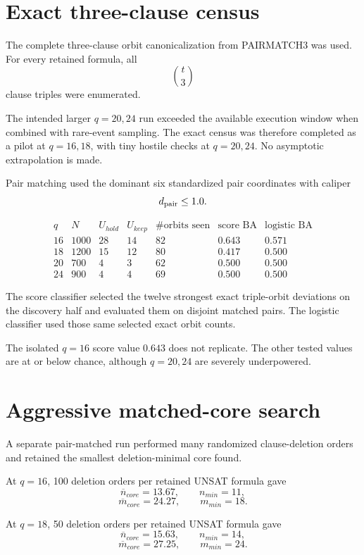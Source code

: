 \documentclass[11pt]{article}
\begin{document}
\section{Exact three-clause census}
The complete three-clause orbit canonicalization from PAIRMATCH3 was used. For every retained formula, all
\[
\binom t3
\]
clause triples were enumerated.

The intended larger \(q=20,24\) run exceeded the available execution window when combined with rare-event sampling. The exact census was therefore completed as a pilot at \(q=16,18\), with tiny hostile checks at \(q=20,24\). No asymptotic extrapolation is made.

Pair matching used the dominant six standardized pair coordinates with caliper
\[
d_{\rm pair}\le1.0.
\]

\[
\begin{array}{c|c|c|c|c|c|c}
q&N&U_{hold}&U_{keep}&\#\text{orbits seen}&
\text{score BA}&\text{logistic BA}\\
\hline
16&1000&28&14&82&0.643&0.571\\
18&1200&15&12&80&0.417&0.500\\
20&700&4&3&62&0.500&0.500\\
24&900&4&4&69&0.500&0.500
\end{array}
\]

The score classifier selected the twelve strongest exact triple-orbit deviations on the discovery half and evaluated them on disjoint matched pairs. The logistic classifier used those same selected exact orbit counts.

The isolated \(q=16\) score value \(0.643\) does not replicate. The other tested values are at or below chance, although \(q=20,24\) are severely underpowered.

\section{Aggressive matched-core search}
A separate pair-matched run performed many randomized clause-deletion orders and retained the smallest deletion-minimal core found.

At \(q=16\), 100 deletion orders per retained UNSAT formula gave
\[
\overline n_{core}=13.67,
\qquad
n_{min}=11,
\]
\[
\overline m_{core}=24.27,
\qquad
m_{min}=18.
\]

At \(q=18\), 50 deletion orders per retained UNSAT formula gave
\[
\overline n_{core}=15.63,
\qquad
n_{min}=14,
\]
\[
\overline m_{core}=27.25,
\qquad
m_{min}=24.
\]
\end{document}

